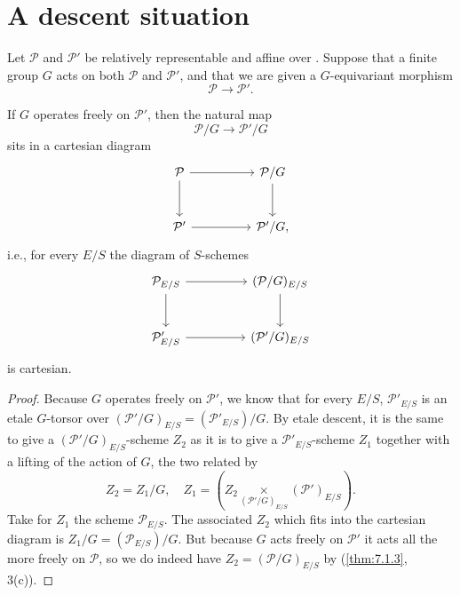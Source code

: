 \section{A descent situation}
\label{sec:7.2}

\kmitem\label{item:7.2.1}
Let $\mathcal{P}$ and $\mathcal{P}'$ be relatively representable and affine over \EllR. Suppose that a finite group $G$ acts on both $\mathcal{P}$ and $\mathcal{P}'$, and that we are given a $G$-equivariant morphism
\[
\mathcal{P} \to \mathcal{P}' .
\]

\begin{kprop}\label{prop:7.2.2}
If $G$ operates freely on $\mathcal{P}'$, then the natural map
\[
\mathcal{P}/G \to \mathcal{P}'/G
\]
sits in a cartesian diagram
\[
\begin{tikzcd}[column sep=huge, row sep=large]
\mathcal{P} \arrow[r] \arrow[d] & \mathcal{P}/G \arrow[d] \\
\mathcal{P}' \arrow[r] & \mathcal{P}'/G ,
\end{tikzcd}
\]
i.e., for every $E/S$ the diagram of $S$-schemes
\[
\begin{tikzcd}[column sep=huge, row sep=large]
\mathcal{P}_{E/S} \arrow[r] \arrow[d] & (\mathcal{P}/G)_{E/S} \arrow[d] \\
\mathcal{P}'_{E/S} \arrow[r] & (\mathcal{P}'/G)_{E/S}
\end{tikzcd}
\]
is cartesian.
\end{kprop}

\begin{proof}
Because $G$ operates freely on $\mathcal{P}'$, we know that for every $E/S$, $\mathcal{P}'_{E/S}$ is an etale $G$-torsor over $(\mathcal{P}'/G)_{E/S} = (\mathcal{P}'_{E/S})/G$. By etale descent, it is the same to give a $(\mathcal{P}'/G)_{E/S}$-scheme $Z_2$ as it is to give a $\mathcal{P}'_{E/S}$-scheme $Z_1$ together with a lifting of the action of $G$, the two related by
\[
Z_2 = Z_1/G, \quad Z_1 = \left( Z_2 \underset{(\mathcal{P}'/G)_{E/S}}{\times} (\mathcal{P}')_{E/S} \right) .
\]
Take for $Z_1$ the scheme $\mathcal{P}_{E/S}$. The associated $Z_2$ which fits into the cartesian diagram is $Z_1/G = (\mathcal{P}_{E/S})/G$. But because $G$ acts freely on $\mathcal{P}'$ it acts all the more freely on $\mathcal{P}$, so we do indeed have $Z_2 = (\mathcal{P}/G)_{E/S}$ by (\ref{thm:7.1.3}, 3(c)).
\end{proof}

